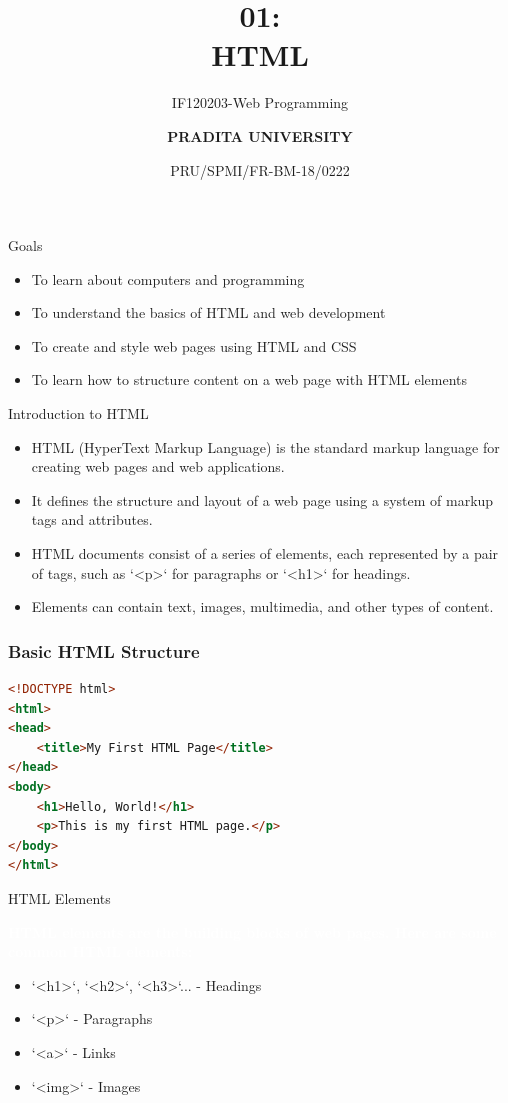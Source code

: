 \documentclass[aspectratio=169, table]{beamer}
\subtitle{IF120203-Web Programming}
\title{\Huge {\textbf{01: \\HTML}}}
\date[Serial]{\scriptsize {PRU/SPMI/FR-BM-18/0222}}
\author[Pradita]{\small {\textbf{PRADITA UNIVERSITY}}}
\begin{document}
\begin{frame}
		\titlepage
	\end{frame}
	
	\begin{frame}{Goals}
		\vskip-1cm
		\begin{itemize}
			\item To learn about computers and programming
			\item To understand the basics of HTML and web development
			\item To create and style web pages using HTML and CSS
			\item To learn how to structure content on a web page with HTML elements
		\end{itemize}
	\end{frame}

	\begin{frame}{Introduction to HTML}
		\vskip-0.5cm
		\begin{itemize}
			\item HTML (HyperText Markup Language) is the standard markup language for creating web pages and web applications.
			\item It defines the structure and layout of a web page using a system of markup tags and attributes.
			\item HTML documents consist of a series of elements, each represented by a pair of tags, such as `<p>` for paragraphs or `<h1>` for headings.
			\item Elements can contain text, images, multimedia, and other types of content.
		\end{itemize}
	\end{frame}

	\begin{frame}[fragile] %
		\frametitle{Basic HTML Structure}
		\vskip0.5cm
		\begin{lstlisting}[language=HTML]
<!DOCTYPE html>
<html>
<head>
    <title>My First HTML Page</title>
</head>
<body>
    <h1>Hello, World!</h1>
    <p>This is my first HTML page.</p>
</body>
</html>
		\end{lstlisting}
	\end{frame}

	\begin{frame}{HTML Elements}
		\begin{tcolorbox}[standard jigsaw, opacityback=0, opacityframe=0, sharp corners, boxrule=0pt]
					\textbf{\textcolor{white}{HTML elements are the building blocks of web pages. Here are some common HTML elements:}}
					\begin{itemize}
						\item `<h1>`, `<h2>`, `<h3>`... - Headings
						\item `<p>` - Paragraphs
						\item `<a>` - Links
						\item `<img>` - Images
					\end{itemize}
		\end{tcolorbox}
	\end{frame}
\end{document}
